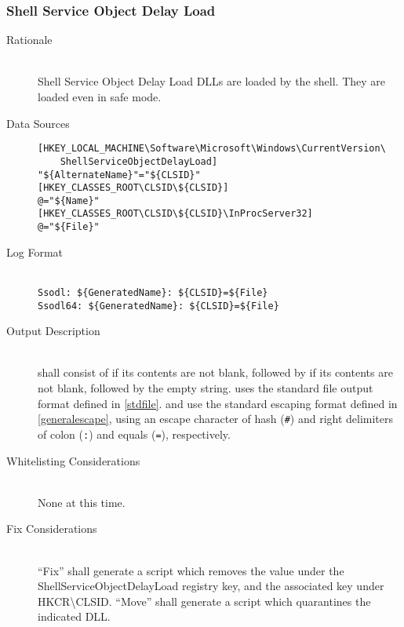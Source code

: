 \subsubsection{Shell Service Object Delay Load}
\begin{description}
\item[Rationale] \hfill \\
Shell Service Object Delay Load DLLs are loaded by the shell. They are loaded
even in safe mode.
\item[Data Sources] \hfill
\vspace{-\baselineskip}
\begin{verbatim}
[HKEY_LOCAL_MACHINE\Software\Microsoft\Windows\CurrentVersion\
    ShellServiceObjectDelayLoad]
"${AlternateName}"="${CLSID}"
[HKEY_CLASSES_ROOT\CLSID\${CLSID}]
@="${Name}"
[HKEY_CLASSES_ROOT\CLSID\${CLSID}\InProcServer32]
@="${File}"
\end{verbatim}
\item[Log Format] \hfill \\
\verb|Ssodl: ${GeneratedName}: ${CLSID}=${File}| \\
\verb|Ssodl64: ${GeneratedName}: ${CLSID}=${File}|
\item[Output Description] \hfill \\
 shall consist of  if its
contents are not blank, followed by  if its contents are
not blank, followed by the empty string. \var{File} uses the standard file
output format defined in \ref{stdfile}. \var{GeneratedName} and \var{CLSID} use
the standard escaping format defined in \ref{generalescape}, using an escape
character of hash (\verb|#|) and right delimiters of colon (\verb|:|) and
equals (\verb|=|), respectively.
\item[Whitelisting Considerations] \hfill \\
None at this time.
\item[Fix Considerations] \hfill \\
``Fix'' shall generate a script which removes the value under the
ShellServiceObjectDelayLoad registry key, and the associated key under
HKCR\textbackslash{}CLSID.
``Move'' shall generate a script which quarantines the indicated DLL.
\end{description}


